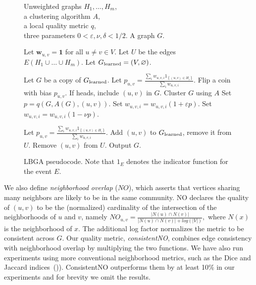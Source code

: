\documentclass{article}
\begin{document}
\begin{figure}
\begin{minipage}{0.5\textwidth}
\begin{algorithm}[H]
\caption{LBGA pseudocode. Note that $1_E$ denotes the indicator function for the event $E$.}
\label{alg:lbga}
\begin{algorithmic}
\REQUIRE Unweighted graphs $H_1, \dots, H_m$, \\ a
clustering algorithm $A$, \\ a local quality metric $q$, \\ three parameters
$0 < \varepsilon, \nu, \delta < 1/2$.
\ENSURE A graph $G$.
 
\STATE Let $\mathbf{w}_{u,v} = \mathbf{1}$ for all $u \neq v \in V$. 
\STATE Let $U$ be the edges $E(H_1 \cup \dots \cup H_m)$. 
\STATE Let $G_\textup{learned} = (V, \varnothing)$. 

   \STATE Let $G$ be a copy of $G_{\textup{learned}}$.
      \STATE Let $p_{u,v} = \frac{\sum_i w_{u,v,i} 1_{\left \{(u,v) \in H_i \right \}}}{\sum_i w_{u,v,i}}$.
      \STATE Flip a coin with bias $p_{u,v}$. 
      \STATE If heads, include $(u,v)$ in $G$.
   \ENDFOR
   \STATE Cluster $G$ using $A$
      \STATE Set $p = q(G, A(G), (u,v))$.
            \STATE Set $w_{u,v,i} = w_{u,v,i} (1 + \varepsilon p)$.
         \ELSE
            \STATE Set $w_{u,v,i} = w_{u,v,i} (1 - \nu p)$.
         \ENDIF
      \ENDFOR

   \STATE Let $p_{u,v} = \frac{\sum_i w_{u,v,i} 1_{\left \{(u,v) \in H_i \right \}}}{\sum_i w_{u,v,i}}$.
      \STATE Add $(u,v)$ to $G_{\textup{learned}}$, remove it from $U$.
   \ENDIF
      \STATE Remove $(u,v)$ from $U$.
   \ENDIF
   \ENDFOR
\ENDWHILE
\STATE Output $G$.
\end{algorithmic}
\end{algorithm}
\end{minipage}
\end{figure}

We also define \emph{neighborhood overlap} ($NO$), which asserts that vertices
sharing many neighbors are likely to be in the same community. NO declares the
quality of $(u,v)$ to be the (normalized) cardinality of the intersection of
the neighborhoods of $u$ and $v$, namely $NO_{u,v}=\frac{|N(u) \cap
N(v)|}{|N(u) \cap N(v)| + log(|V|)},$ where $N(x)$ is the neighborhood of $x$.
The additional log factor normalizes the metric to be consistent across $G$.
Our quality metric, \emph{consistentNO}, combines edge consistency with
neighborhood overlap by multiplying the two functions. We have also run
experiments using more conventional neighborhood metrics, such as the Dice and
Jaccard indices~(\cite{Dice1945})). ConsistentNO outperforms them by at least
10\% in our experiments and for brevity we omit the results. 
\end{document}
